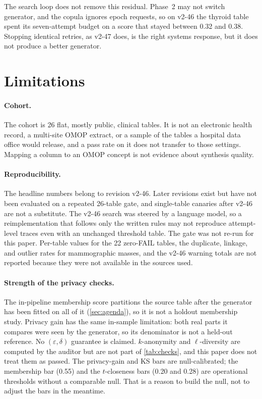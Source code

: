 \documentclass[11pt,a4paper]{article}
\begin{document}
The search loop does not remove this residual. Phase~2 may not switch generator, and the copula ignores epoch requests, so on v2-46 the thyroid table spent its seven-attempt budget on a score that stayed between 0.32 and 0.38. Stopping identical retries, as v2-47 does, is the right systems response, but it does not produce a better generator.

\section{Limitations}\label{sec:limitations}

\paragraph{Cohort.} The cohort is 26 flat, mostly public, clinical tables. It is not an electronic health record, a multi-site OMOP extract, or a sample of the tables a hospital data office would release, and a pass rate on it does not transfer to those settings. Mapping a column to an OMOP concept is not evidence about synthesis quality.

\paragraph{Reproducibility.} The headline numbers belong to revision v2-46. Later revisions exist but have not been evaluated on a repeated 26-table gate, and single-table canaries after v2-46 are not a substitute. The v2-46 search was steered by a language model, so a reimplementation that follows only the written rules may not reproduce attempt-level traces even with an unchanged threshold table. The gate was not re-run for this paper. Per-table values for the 22 zero-FAIL tables, the duplicate, linkage, and outlier rates for mammographic masses, and the v2-46 warning totals are not reported because they were not available in the sources used.

\paragraph{Strength of the privacy checks.} The in-pipeline membership score partitions the source table after the generator has been fitted on all of it (\cref{sec:agenda}), so it is not a holdout membership study. Privacy gain has the same in-sample limitation: both real parts it compares were seen by the generator, so its denominator is not a held-out reference. No $(\varepsilon,\delta)$ guarantee is claimed. $k$-anonymity and $\ell$-diversity are computed by the auditor but are not part of \cref{tab:checks}, and this paper does not treat them as passed. The privacy-gain and KS bars are null-calibrated; the membership bar (0.55) and the $t$-closeness bars (0.20 and 0.28) are operational thresholds without a comparable null. That is a reason to build the null, not to adjust the bars in the meantime.
\end{document}
